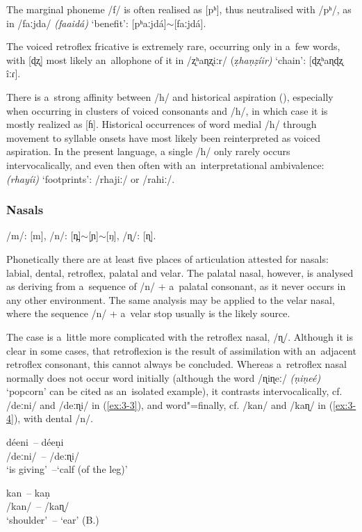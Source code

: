 The marginal phoneme /f/ is often realised as [pʰ], thus neutralised with /pʰ/, as in /faːjda/ \textit{(faaidá)} `benefit': [pʰaːjdá]$\sim$[faːjdá].


The voiced retroflex fricative is extremely rare, occurring only in a~few words, with [ɖʐ] most likely an~allophone of it in /ʐʰaɳʐiːr/ (ẓ\textit{haṇẓíir)} `chain': [ɖʐʰaɳɖʐ îːɾ]. 


There is a~strong affinity between /h/ and historical aspiration (), especially when occurring in clusters of voiced consonants and /h/, in which case it is mostly realized as [ɦ]. Historical occurrences of word medial /h/ through movement to syllable onsets have most likely been reinterpreted as voiced aspiration. In the present language, a single /h/ only rarely occurs intervocalically, and even then often with an~interpretational ambivalence: \textit{(rhayíi)} `footprints': /rhajiː/ or /rahiː/.


\subsubsection*{Nasals}

/m/: [m], /n/: [n̪]$\sim${}[ɲ]$\sim$[ŋ], /ɳ/: [ɳ].


Phonetically there are at least five places of articulation attested for nasals: labial, dental, retroflex, palatal and velar. The palatal nasal, however, is analysed as deriving from a~sequence of /n/ + a~palatal consonant, as it never occurs in any other environment. The same analysis may be applied to the velar nasal, where the sequence /n/ + a~velar stop usually is the likely source.


The case is a~little more complicated with the retroflex nasal, /ɳ/. Although it is clear in some cases, that retroflexion is the result of assimilation with an~adjacent retroflex consonant, this cannot always be concluded. Whereas a~retroflex nasal normally does not occur word initially (although the word /ɳiɳeː/ \textit{(ṇiṇeé)} `popcorn' can be cited as an~isolated example), it contrasts intervocalically, cf. /deːni/ and /deːɳi/ in (\ref{ex:3-3}), and word"=finally, cf. /kan/ and /kaɳ/ in (\ref{ex:3-4}), with dental /n/. 

\begin{exe}
\ex
\label{ex:3-3}
\gll déeni~-- déeṇi \\
/deːni/~-- /deːɳi/ \\
\glt `is giving'~--`calf (of the leg)' 

\ex
\label{ex:3-4}
\gll kan~-- kaṇ \\
/kan/~-- /kaɳ/ \\
\glt `shoulder'~-- `ear' (B.)
\end{exe}


